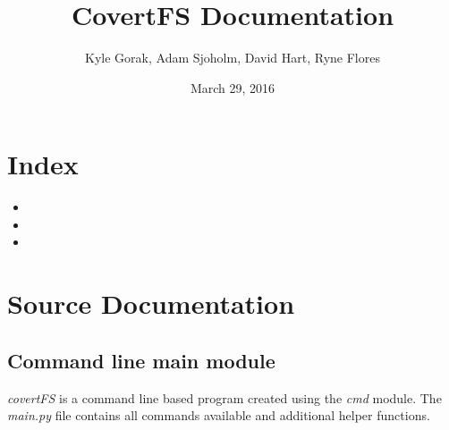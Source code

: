 \documentclass[letterpaper,12pt,openany,oneside]{sphinxmanual}
\title{CovertFS Documentation}
\date{March 29, 2016}
\author{Kyle Gorak, Adam Sjoholm, David Hart, Ryne Flores}
\begin{document}
\maketitle
\tableofcontents
{}\label{index::doc}



\chapter{Index}
\label{index:index}\label{index:welcome-to-covertfs}\begin{itemize}
\item {} 

\item {} 

\item {} 

\end{itemize}


\chapter{Source Documentation}
\label{index:source-documentation}

\section{Command line main module}
\label{console:command-line-main-module}\label{console::doc}\label{console:module-covertFS.console}
\emph{covertFS} is a command line based program created using the \emph{cmd} module.
The \emph{main.py} file contains all commands available and additional helper
functions.
\end{document}
